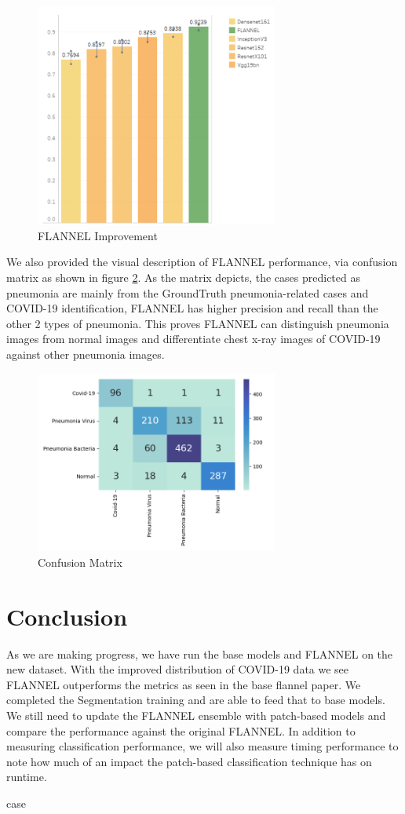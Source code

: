 \documentclass{sigkddExp}
\begin{document}
\begin{figure}[H]
    \includegraphics[width=8cm]{../doc/images/F1Score_vs_rest.png}
    \caption{FLANNEL Improvement}
    \label{fig:f1score}
\end{figure}


We also provided the visual description of FLANNEL performance, via confusion
matrix as shown in figure \ref{fig:cfmatrix}. As the matrix depicts, the cases
predicted as pneumonia are mainly from the GroundTruth pneumonia-related cases
and COVID-19 identification, FLANNEL has higher precision and recall than the
other 2 types of pneumonia. This proves FLANNEL can distinguish pneumonia images
from normal images and differentiate chest x-ray images of COVID-19 against
other pneumonia images.

\begin{figure}[h]
    \includegraphics[width=8cm]{../doc/images/confusion_matrix.png}
    \caption{Confusion Matrix}
    \label{fig:cfmatrix}
\end{figure}

\section{Conclusion}
As we are making progress, we have run the base models and FLANNEL on the new
dataset. With the improved distribution of COVID-19 data we see FLANNEL
outperforms the metrics as seen in the base flannel paper. We completed the
Segmentation training and are able to feed that to base models. We still need to
update the FLANNEL ensemble with patch-based models and compare the performance
against the original FLANNEL. In addition to measuring classification
performance, we will also measure timing performance to note how much of an
impact the patch-based classification technique has on runtime.

\newpage
%

case
\end{document}
